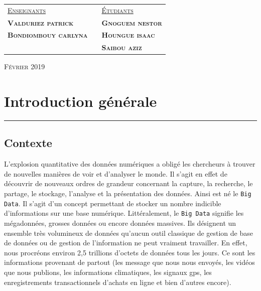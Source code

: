 \documentclass[12pt]{report}
\begin{document}
\begin{center}
		
	
		\vspace{3em}	
		\begin{tabular}{lll}
			\vspace{0.5em}
			 \textsc{\underline{Enseignants}}	& \hspace{3em}	&	\textsc{\underline{Étudiants}}		\\ 
			 \textsc{\textbf{\sc Valduriez patrick}} & \hspace{15em}	&	\textsc{\textbf{\sc Gnoguem nestor}}	 \\				%
			 \textsc{\textbf{\sc Bondiombouy carlyna}}	& \hspace{15em}	&	\textsc{\textbf{\sc Houngue isaac}}	 \\				%
													 	& \hspace{15em}	&	\textsc{\textbf{\sc Saibou aziz}}	 \\				%
		\end{tabular}

		\vspace{6.5em}																
		\textsc{\small Février 2019}
		
		
	\end{center}
	
	\newpage
	\tableofcontents
	
	\newpage

	\section{\sc Introduction générale}
	\rule{1 \textwidth}{0.5pt} \textbf{}
	\vspace{2em}

		\subsection{ \sc Contexte}
		L’explosion quantitative des données numériques a obligé les chercheurs à trouver de nouvelles
		manières de voir et d’analyser le monde. Il s’agit en effet de découvrir de nouveaux ordres de
		grandeur concernant la capture, la recherche, le partage, le stockage, l’analyse et la présentation des données. Ainsi est né le \texttt{Big Data}. Il s’agit d’un concept permettant de stocker un nombre indicible d’informations sur une base numérique. Littéralement, le \texttt{Big Data} signifie les mégadonnées, grosses données ou encore données massives.
		Ils désignent un ensemble très volumineux de données qu’aucun outil classique de gestion de base
		de données ou de gestion de l’information ne peut vraiment travailler.
		En effet, nous procréons environ 2,5 trillions d’octets de données tous les jours. Ce sont les informations provenant de partout (les message que nous nous envoyés, les vidéos que nous publions, les informations climatiques, les signaux {\sc gps}, les enregistrements transactionnels d’achats en ligne et bien
		d’autres encore).
\end{document}
